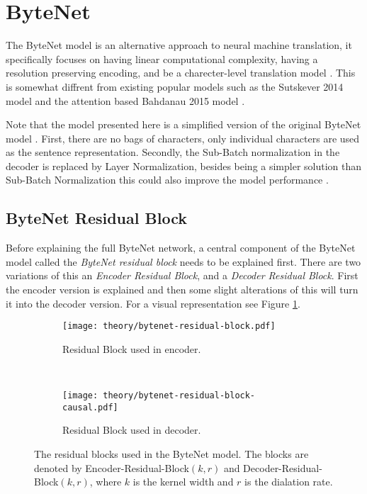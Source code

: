 \section{ByteNet}

The ByteNet model is an alternative approach to neural machine translation, it specifically focuses on having linear computational complexity, having a resolution preserving encoding, and be a charecter-level translation model \cite{bytenet}. This is somewhat diffrent from existing popular models such as the Sutskever 2014 model \cite{sutskever-2014-nmt} and the attention based Bahdanau 2015 model \cite{bahdanau-2015-nmt}.

Note that the model presented here is a simplified version of the original ByteNet model \cite{bytenet}. First, there are no bags of characters, only individual characters are used as the sentence representation. Secondly, the Sub-Batch normalization in the decoder is replaced by Layer Normalization, besides being a simpler solution than Sub-Batch Normalization this could also improve the model performance \cite{layer-normalization}.

\subsection{ByteNet Residual Block}

Before explaining the full ByteNet network, a central component of the ByteNet model called the \textit{ByteNet residual block} needs to be explained first. There are two variations of this an \textit{Encoder Residual Block}, and a \textit{Decoder Residual Block}. First the encoder version is explained and then some slight alterations of this will turn it into the decoder version. For a visual representation see Figure \ref{fig:bytenet:residual-block}.

\begin{figure}[h]
    \centering
    \begin{subfigure}[b]{0.45\textwidth}
        \centering
        \texttt{[image: theory/bytenet-residual-block.pdf]}
        \caption{Residual Block used in encoder.}
    \end{subfigure}
    ~ %
    \begin{subfigure}[b]{0.45\textwidth}
        \centering
        \texttt{[image: theory/bytenet-residual-block-causal.pdf]}
        \caption{Residual Block used in decoder.}
    \end{subfigure}
    \caption{The residual blocks used in the ByteNet model. The blocks are denoted by Encoder-Residual-Block$(k,r)$ and Decoder-Residual-Block$(k,r)$, where $k$ is the kernel width and $r$ is the dialation rate.}
    \label{fig:bytenet:residual-block}
\end{figure}

